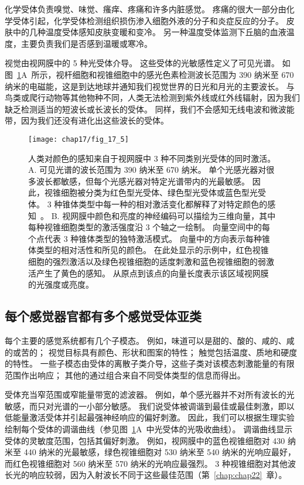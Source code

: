 化学受体负责嗅觉、味觉、瘙痒、疼痛和许多内脏感觉。 
疼痛的很大一部分由化学受体引起，化学受体检测组织损伤渗入细胞外液的分子和炎症反应的分子。
皮肤中的几种温度受体感知皮肤变暖和变冷。
另一种温度受体监测下丘脑的血液温度，主要负责我们是否感到温暖或寒冷。


视觉由视网膜中的 5 种光受体介导。
这些受体的光敏感性定义了可见光谱。 
如图~\ref{fig:17_5}A~所示，视杆细胞和视锥细胞中的感光色素检测波长范围为 390 纳米至 670 纳米的电磁能，这是到达地球并通知我们视觉世界的日光和月光的主要波长。
与鸟类或爬行动物等其他物种不同，人类无法检测到紫外线或红外线辐射，因为我们缺乏检测适当的短波长或长波长的受体。
同样，我们不会感知无线电波和微波能带，因为我们还没有进化出这些波长的受体。


\begin{figure}[htbp]
	\centering
	\texttt{[image: chap17/fig\_17\_5]}
	\caption{人类对颜色的感知来自于视网膜中 3 种不同类别光受体的同时激活。
		A. 可见光谱的波长范围为 390 纳米至 670 纳米。
		单个光感光器对很多波长都敏感，但每个光感光器对特定光谱带内的光最敏感。
		因此，视锥细胞被分类为红色型光受体、绿色型光受体或蓝色型光受体。
		3 种锥体类型中每一种的相对激活变化都解释了对特定颜色的感知~\cite{dowling1987retina}。
		B. 视网膜中颜色和亮度的神经编码可以描绘为三维向量，其中每种视锥细胞类型的激活强度沿 3 个轴之一绘制。
		向量空间中的每个点代表 3 种锥体类型的独特激活模式。
		向量中的方向表示每种锥体类型的相对活性和所见的颜色。
		在此处显示的示例中，红色视锥细胞的强烈激活以及绿色视锥细胞的适度刺激和蓝色视锥细胞的弱激活产生了黄色的感知。
		从原点到该点的向量长度表示该区域视网膜的光强度或亮度。}
	\label{fig:17_5}
\end{figure}



\subsection{每个感觉器官都有多个感觉受体亚类}

每个主要的感觉系统都有几个子模态。 
例如，味道可以是甜的、酸的、咸的、咸的或苦的； 
视觉目标具有颜色、形状和图案的特性； 
触觉包括温度、质地和硬度的特性。 
一些子模态由受体的离散子类介导，这些子类对该模态刺激能量的有限范围作出响应；
其他的通过组合来自不同受体类型的信息而得出。


受体充当窄范围或窄能量带宽的滤波器。
例如，单个感光器并不对所有波长的光敏感，而只对光谱的一小部分敏感。 
我们说受体被调谐到最佳或最佳刺激，即以低能量激活受体并引起最强神经响应的偏好刺激。
因此，我们可以根据生理实验绘制每个受体的调谐曲线（参见图~\ref{fig:17_5}A~中光受体的光吸收曲线）。
调谐曲线显示受体的灵敏度范围，包括其偏好刺激。
例如，视网膜中的蓝色视锥细胞对 430 纳米至 440 纳米的光最敏感，绿色视锥细胞对 530 纳米至 540 纳米的光响应最好，而红色视锥细胞对 560 纳米至 570 纳米的光响应最强烈。
3 种视锥细胞对其他波长光的响应较弱，因为入射波长不同于这些最佳范围（第~\ref{chap:chap22}~章）。


